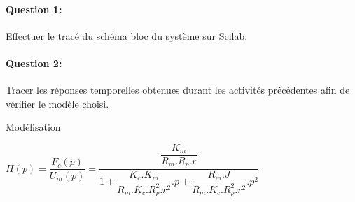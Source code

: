 \paragraph{Question 1:} Effectuer le tracé du schéma bloc du système sur Scilab.

\paragraph{Question 2:} Tracer les réponses temporelles obtenues durant les activités précédentes afin de vérifier le modèle choisi.

\ifdef{\public}{}{}

\newpage

\pagestyle{correction}\setcounter{section}{0}

Modélisation
\begin{center}
$H(p)=\dfrac{F_c(p)}{U_m(p)}=\dfrac{\dfrac{K_m}{R_m.R_p.r}}{1+\dfrac{K_e.K_m}{R_m.K_c.R_p^2.r^2}.p+\dfrac{R_m.J}{R_m.K_c.R_p^2.r^2}.p^2}$
\end{center}

